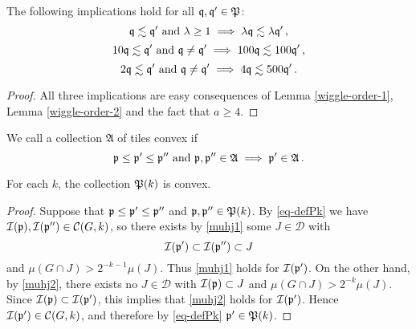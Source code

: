 {\begin{lemma}
\label{wiggle-order-3}
    The following implications hold for all ${\mathfrak q}, {\mathfrak q}' \in {\mathfrak P}$:
    \begin{equation}
        \label{eq-sc1}
        {\mathfrak q} \lesssim {\mathfrak q}' \ \text{and} \ \lambda \ge 1 \implies \lambda {\mathfrak q} \lesssim \lambda {\mathfrak q}'\,,
    \end{equation}
    \begin{equation}
        \label{eq-sc2}
        10{\mathfrak q} \lesssim {\mathfrak q}' \ \text{and} \ {\mathfrak q} \ne {\mathfrak q}' \implies 100 {\mathfrak q} \lesssim 100 {\mathfrak q}'\,,
    \end{equation}
    \begin{equation}
        \label{eq-sc3}
        2{\mathfrak q} \lesssim {\mathfrak q}' \ \text{and} \ {\mathfrak q} \ne {\mathfrak q}' \implies 4 {\mathfrak q} \lesssim 500 {\mathfrak q}'\,.
    \end{equation}
\end{lemma}

\begin{proof}
    All three implications are easy consequences of Lemma \ref{wiggle-order-1}, Lemma \ref{wiggle-order-2} and the fact that $a \ge 4$.
\end{proof}



We call a collection $\mathfrak{A}$ of tiles convex if
\begin{equation}
    \label{eq-convexity}
    {\mathfrak p} \le {\mathfrak p}' \le {\mathfrak p}'' \ \text{and} \ {\mathfrak p}, {\mathfrak p}'' \in \mathfrak{A} \implies {\mathfrak p}' \in \mathfrak{A}\,.
\end{equation}

\begin{lemma}[P convex]
    \label{P-convex}

    For each $k$, the collection ${\mathfrak P}(k)$ is convex.
\end{lemma}

\begin{proof}
    Suppose that ${\mathfrak p} \le {\mathfrak p}' \le {\mathfrak p}''$ and ${\mathfrak p}, {\mathfrak p}'' \in {\mathfrak P}(k)$. By \eqref{eq-defPk} we have ${\mathcal{I}}({\mathfrak p}), {\mathcal{I}}({\mathfrak p}'') \in \mathcal{C}(G,k)$, so there exists by \eqref{muhj1} some $J \in \mathcal{D}$ with
    $$
        {\mathcal{I}}({\mathfrak p}') \subset {\mathcal{I}}({\mathfrak p}'') \subset J
    $$
    and $\mu(G \cap J) > 2^{-k-1} \mu(J)$. Thus \eqref{muhj1} holds for ${\mathcal{I}}({\mathfrak p}')$. On the other hand, by \eqref{muhj2}, there exists no $J \in \mathcal{D}$ with ${\mathcal{I}}({\mathfrak p}) \subset J$ and $\mu(G \cap J) > 2^{-k} \mu(J)$. Since ${\mathcal{I}}({\mathfrak p}) \subset {\mathcal{I}}({\mathfrak p}')$, this implies that \eqref{muhj2} holds for ${\mathcal{I}}({\mathfrak p}')$. Hence ${\mathcal{I}}({\mathfrak p}') \in \mathcal{C}(G,k)$, and therefore by \eqref{eq-defPk} ${\mathfrak p}' \in {\mathfrak P}(k)$.
\end{proof}

}
